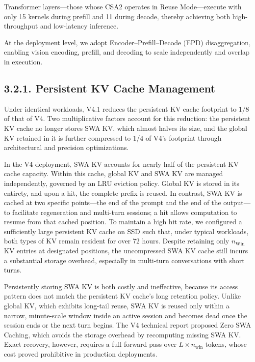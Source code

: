 \documentclass[
  10
]{article}
\begin{document}
Transformer layers---those whose CSA2 operates in Reuse Mode---execute
with only 15 kernels during prefill and 11 during decode, thereby
achieving both high-throughput and low-latency inference.

At the deployment level, we adopt Encoder--Prefill--Decode (EPD)
disaggregation, enabling vision encoding, prefill, and decoding to scale
independently and overlap in execution.

\subsection{3.2.1. Persistent KV Cache
Management}\label{persistent-kv-cache-management}

Under identical workloads, V4.1 reduces the persistent KV cache
footprint to \(1 / 8\) of that of V4. Two multiplicative factors account
for this reduction: the persistent KV cache no longer stores SWA KV,
which almost halves its size, and the global KV retained in it is
further compressed to 1/4 of V4's footprint through architectural and
precision optimizations.

In the V4 deployment, SWA KV accounts for nearly half of the persistent
KV cache capacity. Within this cache, global KV and SWA KV are managed
independently, governed by an LRU eviction policy. Global KV is stored
in its entirety, and upon a hit, the complete prefix is reused. In
contrast, SWA KV is cached at two specific points---the end of the
prompt and the end of the output---to facilitate regeneration and
multi-turn sessions; a hit allows computation to resume from that cached
position. To maintain a high hit rate, we configured a sufficiently
large persistent KV cache on SSD such that, under typical workloads,
both types of KV remain resident for over 72 hours. Despite retaining
only \(n _ { \mathrm { W i n } }\) KV entries at designated positions,
the uncompressed SWA KV cache still incurs a substantial storage
overhead, especially in multi-turn conversations with short turns.

Persistently storing SWA KV is both costly and ineffective, because its
access pattern does not match the persistent KV cache's long retention
policy. Unlike global KV, which exhibits long-tail reuse, SWA KV is
reused only within a narrow, minute-scale window inside an active
session and becomes dead once the session ends or the next turn begins.
The V4 technical report proposed Zero SWA Caching, which avoids the
storage overhead by recomputing missing SWA KV. Exact recovery, however,
requires a full forward pass over \(L \times n _ { \mathrm { w i n } }\)
tokens, whose cost proved prohibitive in production deployments.
\end{document}
